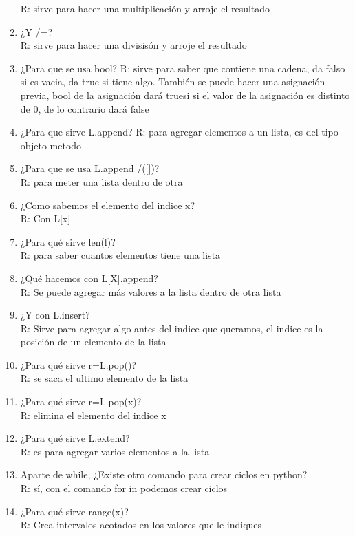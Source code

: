 \documentclass[letterpaper, 12pt, oneside]{article}%
\begin{document}
\begin{enumerate}
R: sirve para hacer una multiplicación y arroje el resultado
\item ¿Y /=?\\
R: sirve para hacer una divisisón y arroje el resultado
\item ¿Para que se usa bool?
R: sirve para saber que contiene una cadena, da falso si es vacia, da true si tiene algo. También se puede hacer una asignación previa, bool de la asignación dará truesi si el valor de la asignación es distinto de 0, de lo contrario dará false
\item ¿Para que sirve L.append?
R: para agregar elementos a un lista, es del tipo objeto metodo
\item ¿Para que se usa L.append /([])?\\
R: para meter una lista dentro de otra
\item ¿Como sabemos el elemento del indice x?\\
R: Con L[x]
\item ¿Para qué sirve len(l)?\\
R: para saber cuantos elementos tiene una lista
\item ¿Qué hacemos con L[X].append?\\
R: Se puede agregar más valores a la lista dentro de otra lista
\item ¿Y con L.insert?\\
R: Sirve para agregar algo antes del indice que queramos, el indice es la posición de un elemento de la lista
\item ¿Para qué sirve r=L.pop()?\\
R: se saca el ultimo elemento de la lista
\item ¿Para qué sirve r=L.pop(x)?\\
R: elimina el elemento del indice x
\item ¿Para qué sirve L.extend?\\
R: es para agregar varios elementos a la lista

	\item Aparte de while, ¿Existe otro comando para crear ciclos en python?\\
R: sí, con el comando for in podemos crear ciclos
	\item ¿Para qué sirve range(x)?\\
R: Crea intervalos acotados en los valores que le indiques
	
\end{enumerate}
\end{document}
